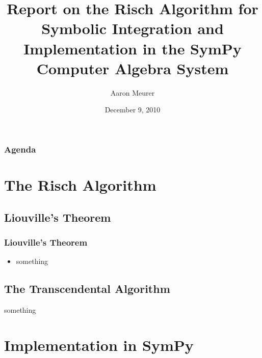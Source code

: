 \documentclass{beamer}
\title{Report on the Risch Algorithm for Symbolic
Integration and Implementation in the SymPy Computer Algebra System}
\author{Aaron Meurer}
\date{December 9, 2010}
\numberwithin{equation}{section} %
\begin{document}
\begin{frame}
    \titlepage
\end{frame}

\begin{frame} 
    \frametitle{Agenda} 
    \tableofcontents 
\end{frame} 

\section{The Risch Algorithm}

\subsection{Liouville's Theorem}

\begin{frame}
    \frametitle{Liouville's Theorem}
    \begin{itemize}
    \item something
    \end{itemize}
\end{frame}

\subsection{The Transcendental Algorithm}

\begin{frame}
    something
\end{frame}

\section{Implementation in SymPy}
\end{document}
